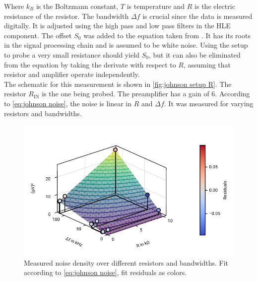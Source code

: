 \documentclass[
    parskip=half, 
    twoside=false,
    twocolumn=true,
    fontsize=11pt,
]{scrarticle}
\begin{document}
Where $k_B$ is the Boltzmann constant, $T$ is temperature and $R$ is the electric resistance of the resistor. The bandwidth $\Delta f$ is crucial since the data is measured digitally. It is adjusted using the high pass and low pass filters in the HLE component. The offset $S_0$ was added to the equation taken from \autocite{Buch}. It has its roots in the signal processing chain and is assumed to be white noise. 
Using the setup to probe a very small resistance should yield $S_0$, but it can also be eliminated from the equation by taking the derivate with respect to $R$, assuming that resistor and amplifier operate independently.\\
The schematic for this measurement is shown in \autoref{fig:johnson setup R}. The resistor $R_\text{IN}$ is the one being probed. The preamplifier has a gain of $6$.  According to \autoref{eq:johnson noise}, the noise is linear in $R$ and $\Delta f$. It was measured for varying resistors and bandwidths.
\begin{figure}[h!]
    \centering
    \includegraphics{figures/05 johnson noise rt plane.pdf}
    \caption{
        Measured noise density over different resistors and bandwidths.
        Fit according to \autoref{eq:johnson noise}, fit residuals as colors.
    }
    \label{fig:johnson noise}
\end{figure}
\end{document}
